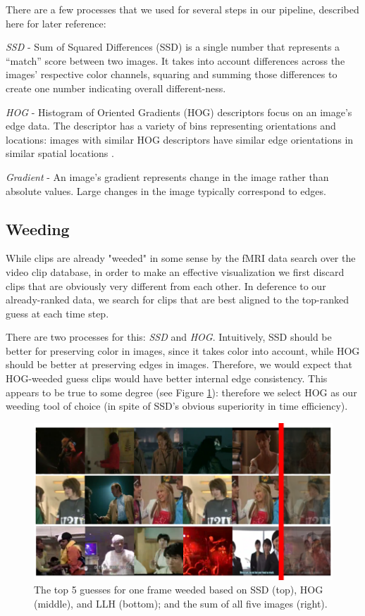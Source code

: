 There are a few processes that we used for several steps in our pipeline, described here for later reference:

\emph{SSD} - Sum of Squared Differences (SSD) is a single number that represents a ``match'' score between two images.  It takes into account differences across the images' respective color channels, squaring and summing those differences to create one number indicating overall different-ness.

\emph{HOG} - Histogram of Oriented Gradients (HOG) descriptors focus on an image's edge data.  The descriptor has a variety of bins representing orientations and locations: images with similar HOG descriptors have similar edge orientations in similar spatial locations \cite{HOG}.

\emph{Gradient} - An image's gradient represents change in the image rather than absolute values.  Large changes in the image typically correspond to edges.

\subsection{Weeding}
While clips are already "weeded" in some sense by the fMRI data search over the video clip database, in order to make an effective visualization we first discard clips that are obviously very different from each other.  In deference to our already-ranked data, we search for clips that are best aligned to the top-ranked guess at each time step.

There are two processes for this: \emph{SSD} and \emph{HOG}.  Intuitively, SSD should be better for preserving color in images, since it takes color into account, while HOG should be better at preserving edges in images.  Therefore, we would expect that HOG-weeded guess clips would have better internal edge consistency.  This appears to be true to some degree (see Figure \ref{fig:weeding}): therefore we select HOG as our weeding tool of choice (in spite of SSD's obvious superiority in time efficiency).

\begin{figure}
\centering
    \includegraphics[width=1.0\columnwidth]{figures/preproc.png}
\caption{The top 5 guesses for one frame weeded based on SSD (top), HOG (middle), and LLH (bottom); and the sum of all five images (right).}
\label{fig:weeding}
\end{figure}

